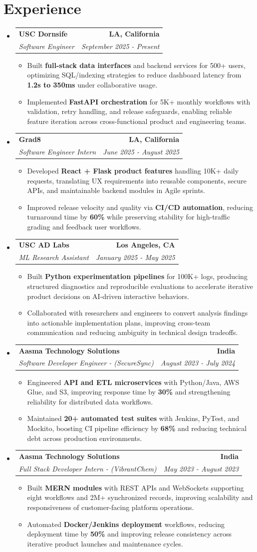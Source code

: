 \documentclass[letterpaper,10pt]{article}
\makeatletter
\newcommand{\resumeItem}[1]{\item\small{{#1 \vspace{-2pt}}}}
\newcommand{\resumeSubheading}[4]{\vspace{-2pt}\item\begin{tabular*}{1.0\textwidth}[t]{l@{\extracolsep{\fill}}r}\textbf{#1} & \textbf{\small #2} \\\textit{\small#3} & \textit{\small #4} \\\end{tabular*}\vspace{-3pt}}
\newcommand{\resumeSubHeadingListStart}{\begin{itemize}[leftmargin=0.0in, label={}]}
\newcommand{\resumeSubHeadingListEnd}{\end{itemize}}
\newcommand{\resumeItemListStart}{\begin{itemize}[leftmargin=0.15in,label=\textbullet,itemsep=0pt,topsep=0pt,parsep=0pt,partopsep=0pt]}
\newcommand{\resumeItemListEnd}{\end{itemize}\vspace{-2pt}}
\makeatother
\begin{document}
\section{Experience}
\resumeSubHeadingListStart
\resumeSubheading{USC Dornsife}{LA, California}{Software Engineer}{September 2025 - Present}
\resumeItemListStart
\resumeItem{Built \textbf{full-stack data interfaces} and backend services for 500+ users, optimizing SQL/indexing strategies to reduce dashboard latency from \textbf{1.2s to 350ms} under collaborative usage.}
\resumeItem{Implemented \textbf{FastAPI orchestration} for 5K+ monthly workflows with validation, retry handling, and release safeguards, enabling reliable feature iteration across cross-functional product and engineering teams.}
\resumeItemListEnd
\resumeSubheading{Grad8}{LA, California}{Software Engineer Intern}{June 2025 - August 2025}
\resumeItemListStart
\resumeItem{Developed \textbf{React + Flask product features} handling 10K+ daily requests, translating UX requirements into reusable components, secure APIs, and maintainable backend modules in Agile sprints.}
\resumeItem{Improved release velocity and quality via \textbf{CI/CD automation}, reducing turnaround time by \textbf{60\%} while preserving stability for high-traffic grading and feedback user workflows.}
\resumeItemListEnd
\resumeSubheading{USC AD Labs}{Los Angeles, CA}{ML Research Assistant}{January 2025 - May 2025}
\resumeItemListStart
\resumeItem{Built \textbf{Python experimentation pipelines} for 100K+ logs, producing structured diagnostics and reproducible evaluations to accelerate iterative product decisions on AI-driven interactive behaviors.}
\resumeItem{Collaborated with researchers and engineers to convert analysis findings into actionable implementation plans, improving cross-team communication and reducing ambiguity in technical design tradeoffs.}
\resumeItemListEnd
\resumeSubheading{Aasma Technology Solutions}{India}{Software Developer Engineer - (SecureSync)}{August 2023 - July 2024}
\resumeItemListStart
\resumeItem{Engineered \textbf{API and ETL microservices} with Python/Java, AWS Glue, and S3, improving response time by \textbf{30\%} and strengthening reliability for distributed data workflows.}
\resumeItem{Maintained \textbf{20+ automated test suites} with Jenkins, PyTest, and Mockito, boosting CI pipeline efficiency by \textbf{68\%} and reducing technical debt across production environments.}
\resumeItemListEnd
\resumeSubheading{Aasma Technology Solutions}{India}{Full Stack Developer Intern - (VibrantChem)}{May 2023 - August 2023}
\resumeItemListStart
\resumeItem{Built \textbf{MERN modules} with REST APIs and WebSockets supporting eight workflows and 2M+ synchronized records, improving scalability and responsiveness of customer-facing platform operations.}
\resumeItem{Automated \textbf{Docker/Jenkins deployment} workflows, reducing deployment time by \textbf{50\%} and improving release consistency across iterative product launches and maintenance cycles.}
\resumeItemListEnd
\resumeSubHeadingListEnd
\vspace{-15pt}
\end{document}
